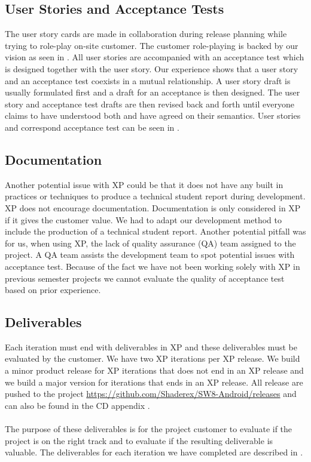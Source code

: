 \subsection{User Stories and Acceptance Tests}
The user story cards are made in collaboration during release planning while trying to role-play on-site customer. The customer role-playing is backed by our vision as seen in . All user stories are accompanied with an acceptance test which is designed together with the user story. Our experience shows that a user story and an acceptance test coexists in a mutual relationship. A user story draft is usually formulated first and a draft for an acceptance is then designed. The user story and acceptance test drafts are then revised back and forth until everyone claims to have understood both and have agreed on their semantics. User stories and correspond acceptance test can be seen in . 


\subsection{Documentation}
Another potential issue with XP could be that it does not have any built in practices or techniques to produce a technical student report during development. XP does not encourage documentation. Documentation is only considered in XP if it gives the customer value. We had to 
adapt our development method to include the production of a technical student report. Another potential pitfall was for us, when using XP, the lack of quality assurance (QA) team assigned to the project. A QA team assists the development team to spot potential issues with acceptance test. Because of the fact we have not been working solely with XP in previous semester projects we cannot evaluate the quality of acceptance test based on prior experience.

\subsection{Deliverables}
Each iteration must end with deliverables in XP and these deliverables must be evaluated by the customer. We have two XP iterations per XP release. We build a minor product release for XP iterations that does not end in an XP release and we build a major version for iterations that ends in an XP release. All release are pushed to the project \hyperref[GitHub page]{https://github.com/Shaderex/SW8-Android/releases} and can also be found in the CD appendix . 
\\\\
The purpose of these deliverables is for the project customer to evaluate if the project is on the right track and to evaluate if the resulting deliverable is valuable. The deliverables for each iteration we have completed are described in . 

